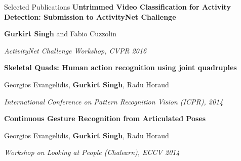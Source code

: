 \documentclass{resume} %
\begin{document}
\begin{rSection}{Selected Publications}
\vspace{-0.03in}
\textbf{Untrimmed Video Classification for Activity Detection: Submission to ActivityNet Challenge}

\vspace{-0.08in}
\small{\textbf{Gurkirt Singh} and Fabio Cuzzolin}

\vspace{-0.08in}
\textit{\small{ActivityNet Challenge Workshop, CVPR 2016}}


\vspace{-0.03in}
\textbf{Skeletal Quads: Human action recognition using joint quadruples}

\vspace{-0.08in}
\small{Georgios Evangelidis, \textbf{Gurkirt Singh}, Radu Horaud}

\vspace{-0.08in}
\textit{\small{International Conference on Pattern Recognition Vision (ICPR), 2014}}


\vspace{-0.03in}
\textbf{Continuous Gesture Recognition from Articulated Poses}

\vspace{-0.08in}
\small{Georgios Evangelidis, \textbf{Gurkirt Singh}, Radu Horaud}

\vspace{-0.08in}
\textit{\small{Workshop on Looking at People (Chalearn), ECCV 2014}}



\end{rSection}
\end{document}
